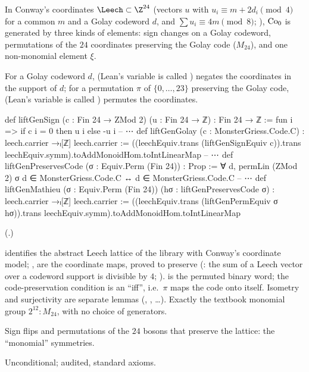 In Conway's coordinates $\Leech\subset\Z^{24}$ (vectors $u$ with $u_i\equiv m+2d_i\pmod 4$ for a common $m$ and a Golay
codeword $d$, and $\sum u_i\equiv4m\pmod 8$; ), $\mathrm{Co}_0$ is generated by three kinds of
elements: sign changes on a Golay codeword, permutations of the $24$ coordinates preserving the Golay code ($M_{24}$),
and one non-monomial element $\xi$.

\begin{definition}\label{ch22:def:monomial}
For a Golay codeword $d$,  (Lean's variable is called ) negates the coordinates in the
support of $d$; for a permutation $\pi$ of $\{0,\dots,23\}$ preserving the Golay code, 
(Lean's variable is called ) permutes the coordinates.
\end{definition}
\begin{leancode}
def liftGenSign (c : Fin 24 → ZMod 2) (u : Fin 24 → ℤ) : Fin 24 → ℤ :=
  fun i => if c i = 0 then u i else -u i
-- ⋯
def liftGenGolay (c : MonsterGriess.Code.C) : leech.carrier →ₗ[ℤ] leech.carrier :=
  ((leechEquiv.trans (liftGenSignEquiv c)).trans leechEquiv.symm).toAddMonoidHom.toIntLinearMap
-- ⋯
def liftGenPreservesCode (σ : Equiv.Perm (Fin 24)) : Prop :=
  ∀ d, permLin (ZMod 2) σ d ∈ MonsterGriess.Code.C ↔ d ∈ MonsterGriess.Code.C
-- ⋯
def liftGenMathieu (σ : Equiv.Perm (Fin 24)) (hσ : liftGenPreservesCode σ) :
    leech.carrier →ₗ[ℤ] leech.carrier :=
  ((leechEquiv.trans (liftGenPermEquiv σ hσ)).trans
    leechEquiv.symm).toAddMonoidHom.toIntLinearMap
\end{leancode}
(.)
\begin{dictionary}
 identifies the abstract Leech lattice of the library with Conway's coordinate model;
,  are the coordinate maps, proved to preserve
 (: the sum of a Leech vector over a codeword support is divisible by $4$;
).   is the permuted binary word; the code-preservation condition is
an ``iff'', i.e.\ $\pi$ maps the code onto itself.  Isometry and surjectivity are separate lemmas
(, , \dots).  Exactly the textbook monomial group
$2^{12}{:}M_{24}$, with no choice of generators.
\end{dictionary}
\begin{physics}
Sign flips and permutations of the $24$ bosons that preserve the lattice: the ``monomial'' symmetries.
\end{physics}
\begin{status}Unconditional; audited, standard axioms.\end{status}

